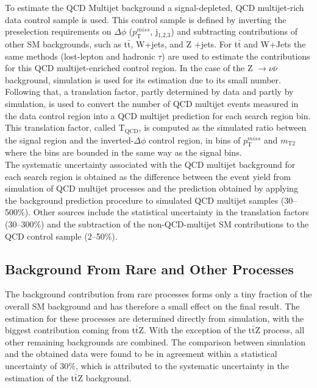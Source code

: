To estimate the QCD Multijet background a signal-depleted, QCD multijet-rich data control sample is used. This control sample is defined by inverting the preselection requirements on $\Delta\phi$ ($p_\text{T}^{miss}$,  j$_\text{1,2,3}$) and subtracting contributions of other SM backgrounds, such as t$\bar{\text{t}}$, W+jets, and Z +jets. For t$\bar{\text{t}}$ and W+Jets the same methods (lost-lepton and hadronic $\tau$) are used to estimate the contributions for this QCD multijet-enriched control region. In the case of the Z $\rightarrow\nu \bar{\nu}$ background, simulation is used for its estimation due to its small number. Following that, a translation factor, partly determined by data and partly by simulation, is used to convert the number of QCD multijet events measured in the data control region into a QCD multijet prediction for each search region bin. This translation factor, called T$_\text{QCD}$,  is computed as the simulated ratio between the signal region and the inverted-$\Delta\phi$ control region, in bins of $p_\text{T}^{miss}$ and $m_\text{T2}$ where the bins are bounded in the same way as the signal bins.\\

The systematic uncertainty associated with the QCD multijet background for each search region is obtained as the difference between the event yield from simulation of QCD multijet processes and the prediction obtained by applying the background prediction procedure to simulated QCD multijet samples (30--500\%). Other sources include the statistical uncertainty in the translation factors (30--300\%) and the subtraction of the non-QCD-multijet SM contributions to the QCD control sample (2--50\%).

\subsection{Background From Rare and Other Processes}

The background contribution from rare processes forms only a tiny fraction of the overall SM background and has therefore a small effect on the final result. The estimation for these processes are determined directly from simulation, with the biggest contribution coming from t$\bar{\text{t}}$Z. With the exception of the t$\bar{\text{t}}$Z process, all other remaining backgrounds are combined. The comparison between simulation and the obtained data were found to be in agreement within a statistical uncertainty of 30\%, which is attributed to the systematic uncertainty in the estimation of the t$\bar{\text{t}}$Z background.

